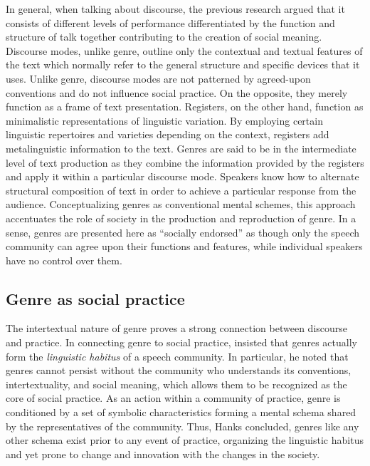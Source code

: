 \documentclass[12pt]{article}
\begin{document}
In general, when talking about discourse, the previous research argued that it consists of different levels of performance differentiated by the function and structure of talk together contributing to the creation of social meaning. Discourse modes, unlike genre, outline only the contextual and textual features of the text which normally refer to the general structure and specific devices that it uses. Unlike genre, discourse modes are not patterned by agreed-upon conventions and do not influence social practice. On the opposite, they merely function as a frame of text presentation. Registers, on the other hand, function as minimalistic representations of linguistic variation. By employing certain linguistic repertoires and varieties depending on the context, registers add metalinguistic information to the text. Genres are said to be in the intermediate level of text production as they combine the information provided by the registers and apply it within a particular discourse mode. Speakers know how to alternate structural composition of text in order to achieve a particular response from the audience. Conceptualizing genres as conventional mental schemes, this approach accentuates the role of society in the production and reproduction of genre. In a sense, genres are presented here as ``socially endorsed'' \parencite[p. 60]{bax2011} as though only the speech community can agree upon their functions and features, while individual speakers have no control over them.  
\subsection{Genre as social practice}
The intertextual nature of genre proves a strong connection between discourse and practice. In connecting genre to social practice, \textcite{hanks1987} insisted that genres actually form the \textit{linguistic habitus} of a speech community. In particular, he noted that genres cannot persist without the community who understands its conventions, intertextuality, and social meaning, which allows them to be recognized as the core of social practice. As an action within a community of practice, genre is conditioned by a set of symbolic characteristics forming a mental schema shared by the representatives of the community. Thus, Hanks concluded, genres like any other schema exist prior to any event of practice, organizing the linguistic habitus and yet prone to change and innovation with the changes in the society.
\end{document}
